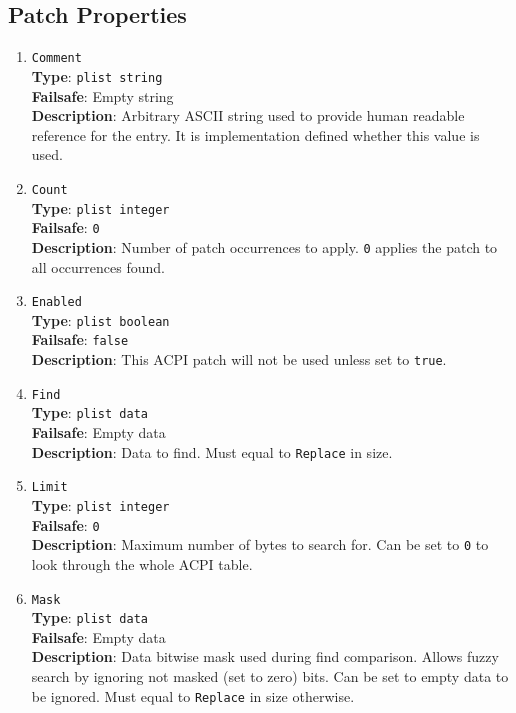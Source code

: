 \documentclass[]{article}
\begin{document}
\subsection{Patch Properties}\label{acpipropspatch}

\begin{enumerate}

\item
  \texttt{Comment}\\
  \textbf{Type}: \texttt{plist\ string}\\
  \textbf{Failsafe}: Empty string\\
  \textbf{Description}: Arbitrary ASCII string used to provide human readable
  reference for the entry. It is implementation defined whether this value is
  used.

\item
  \texttt{Count}\\
  \textbf{Type}: \texttt{plist\ integer}\\
  \textbf{Failsafe}: \texttt{0}\\
  \textbf{Description}: Number of patch occurrences to apply. \texttt{0} applies
  the patch to all occurrences found.

\item
  \texttt{Enabled}\\
  \textbf{Type}: \texttt{plist\ boolean}\\
  \textbf{Failsafe}: \texttt{false}\\
  \textbf{Description}: This ACPI patch will not be used unless set to
  \texttt{true}.

\item
  \texttt{Find}\\
  \textbf{Type}: \texttt{plist\ data}\\
  \textbf{Failsafe}: Empty data\\
  \textbf{Description}: Data to find. Must equal to \texttt{Replace} in size.

\item
  \texttt{Limit}\\
  \textbf{Type}: \texttt{plist\ integer}\\
  \textbf{Failsafe}: \texttt{0}\\
  \textbf{Description}: Maximum number of bytes to search for. Can be set to
  \texttt{0} to look through the whole ACPI table.

\item
  \texttt{Mask}\\
  \textbf{Type}: \texttt{plist\ data}\\
  \textbf{Failsafe}: Empty data\\
  \textbf{Description}: Data bitwise mask used during find comparison.
  Allows fuzzy search by ignoring not masked (set to zero) bits. Can be
  set to empty data to be ignored. Must equal to \texttt{Replace} in size
  otherwise.


\end{enumerate}
\end{document}
